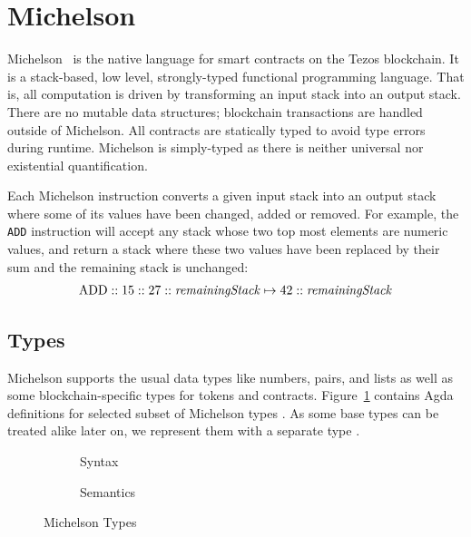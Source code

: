 \section{Michelson}\label{sec:Mtype}


Michelson~\cite{Mref,devres} is the native language for smart contracts on the Tezos blockchain.
It is a stack-based, low level, strongly-typed functional programming
language. That is, all computation is driven by transforming an input
stack into an output stack. There are no mutable data structures;
blockchain transactions are handled outside of Michelson.
All contracts are statically typed to avoid type errors during runtime.
Michelson is simply-typed as there is neither universal nor
existential quantification.

Each Michelson instruction converts a given input stack into an output stack
where some of its values have been changed, added or removed.
For example, the \verb=ADD= instruction will accept any stack
whose two top most elements are numeric values,
and return a stack where these two values have been replaced by their sum
and the remaining stack is unchanged:
\begin{align*}
	\text{ADD} :: 15 :: 27 :: \text{\emph{remainingStack}}
	\mapsto	           42 :: \text{\emph{remainingStack}}
\label{equ:ADD}
\end{align*}

\subsection{Types}
\label{sec:michelson-types}

Michelson supports the usual data types like numbers, pairs, and lists as well as
some blockchain-specific types for tokens and contracts. 
Figure~\ref{fig:Type} contains Agda definitions for selected subset of
Michelson types {\AType}. As some base types can be treated alike later on, we
represent them with a separate type {\ABaseType}.

\begin{figure}[tp]
  \begin{subfigure}{0.48\textwidth}
    \noindent
    \TypesType
    \TypesPatterns
    \caption{Syntax}
    \label{fig:Type}
  \end{subfigure}
  \begin{subfigure}{0.48\textwidth}
  \TypesSemantics
  \caption{Semantics}
  \label{fig:Type-Semantics}
\end{subfigure}
\caption{Michelson Types}
\label{Type}
\end{figure}

